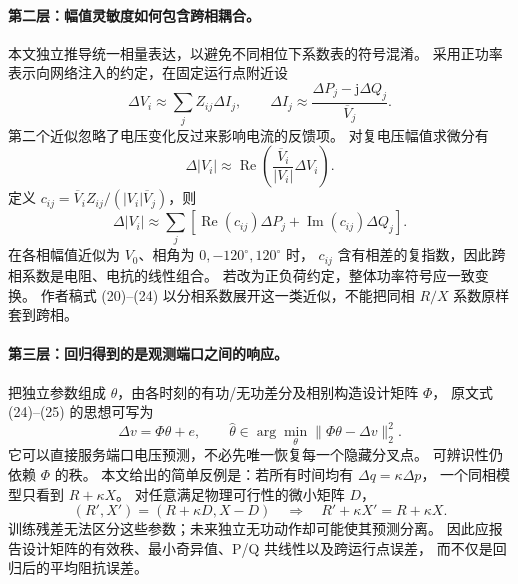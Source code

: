 \documentclass[UTF8,11pt,fontset=fandol]{ctexart}
\theoremstyle{remark}
\numberwithin{equation}{section}
\begin{document}
\paragraph{第二层：幅值灵敏度如何包含跨相耦合。}
本文独立推导统一相量表达，以避免不同相位下系数表的符号混淆。
采用正功率表示向网络注入的约定，在固定运行点附近设
\begin{equation}
 \Delta V_i\approx\sum_j Z_{ij}\Delta I_j,
 \qquad
 \Delta I_j\approx\frac{\Delta P_j-\mathrm j\Delta Q_j}{\overline V_j}.
 \label{eq:eng-s10-di}
\end{equation}
第二个近似忽略了电压变化反过来影响电流的反馈项。
对复电压幅值求微分有
\begin{equation}
 \Delta|V_i|\approx\operatorname{Re}\!\left(
 \frac{\overline V_i}{|V_i|}\Delta V_i\right).
 \label{eq:eng-s10-magnitude}
\end{equation}
定义 $c_{ij}=\overline V_i Z_{ij}/(|V_i|\overline V_j)$，则
\begin{equation}
 \Delta|V_i|\approx\sum_j
 [\operatorname{Re}(c_{ij})\Delta P_j+
   \operatorname{Im}(c_{ij})\Delta Q_j].
 \label{eq:eng-s10-sensitivity}
\end{equation}
在各相幅值近似为 $V_0$、相角为 $0,-120^\circ,120^\circ$ 时，
$c_{ij}$ 含有相差的复指数，因此跨相系数是电阻、电抗的线性组合。
若改为正负荷约定，整体功率符号应一致变换。
作者稿式 (20)--(24) 以分相系数展开这一类近似，不能把同相 $R/X$ 系数原样套到跨相。

\paragraph{第三层：回归得到的是观测端口之间的响应。}
把独立参数组成 $\theta$，由各时刻的有功/无功差分及相别构造设计矩阵 $\Phi$，
原文式 (24)--(25) 的思想可写为
\begin{equation}
 \Delta v=\Phi\theta+e,\qquad
 \widehat\theta\in\arg\min_\theta\|\Phi\theta-\Delta v\|_2^2.
 \label{eq:eng-s10-regression}
\end{equation}
它可以直接服务端口电压预测，不必先唯一恢复每一个隐藏分叉点。
可辨识性仍依赖 $\Phi$ 的秩。
本文给出的简单反例是：若所有时间均有 $\Delta q=\kappa\Delta p$，
一个同相模型只看到 $R+\kappa X$。
对任意满足物理可行性的微小矩阵 $D$，
\begin{equation}
 (R',X')=(R+\kappa D,X-D)
 \quad\Longrightarrow\quad R'+\kappa X'=R+\kappa X.
 \label{eq:eng-s10-confounding}
\end{equation}
训练残差无法区分这些参数；未来独立无功动作却可能使其预测分离。
因此应报告设计矩阵的有效秩、最小奇异值、P/Q 共线性以及跨运行点误差，
而不仅是回归后的平均阻抗误差。
\end{document}
